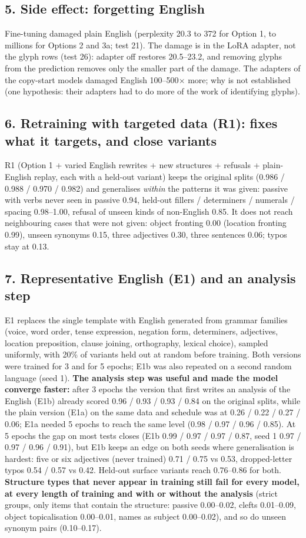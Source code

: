 \documentclass[10pt,a4paper,oneside]{article}
\begin{document}
\subsection*{5. Side effect: forgetting English}
Fine-tuning damaged plain English (perplexity 20.3 to 372 for Option 1, to millions for Options 2 and 3a; test 21).
The damage is in the LoRA adapter, not the glyph rows (test 26): adapter off restores 20.5--23.2, and removing glyphs
from the prediction removes only the smaller part of the damage. The adapters of the copy-start models damaged English
100--500$\times$ more; why is not established (one hypothesis: their adapters had to do more of the work of
identifying glyphs).

\subsection*{6. Retraining with targeted data (R1): fixes what it targets, and close variants}
R1 (Option 1 + varied English rewrites + new structures + refusals + plain-English replay, each with a held-out
variant) keeps the original splits (0.986 / 0.988 / 0.970 / 0.982) and generalises \emph{within} the patterns it was
given: passive with verbs never seen in passive 0.94, held-out fillers / determiners / numerals / spacing 0.98--1.00,
refusal of unseen kinds of non-English 0.85. It does not reach neighbouring cases that were not given: object fronting
0.00 (location fronting 0.99), unseen synonyms 0.15, three adjectives 0.30, three sentences 0.06; typos stay at 0.13.

\subsection*{7. Representative English (E1) and an analysis step}
E1 replaces the single template with English generated from grammar families (voice, word order, tense expression,
negation form, determiners, adjectives, location preposition, clause joining, orthography, lexical choice), sampled
uniformly, with 20\% of variants held out at random before training. Both versions were trained for 3 and for 5 epochs;
E1b was also repeated on a second random language (seed 1).
\textbf{The analysis step was useful and made the model converge faster:} after 3 epochs the version that first writes
an analysis of the English (E1b) already scored 0.96 / 0.93 / 0.93 / 0.84 on the original splits, while the plain
version (E1a) on the same data and schedule was at 0.26 / 0.22 / 0.27 / 0.06; E1a needed 5 epochs to reach the same
level (0.98 / 0.97 / 0.96 / 0.85). At 5 epochs the gap on most tests closes (E1b 0.99 / 0.97 / 0.97 / 0.87, seed 1
0.97 / 0.97 / 0.96 / 0.91), but E1b keeps an edge on both seeds where generalisation is hardest: five or six adjectives
(never trained) 0.71 / 0.75 vs 0.53, dropped-letter typos 0.54 / 0.57 vs 0.42. Held-out surface variants reach
0.76--0.86 for both. \textbf{Structure types that never appear in training still fail for every model, at every
length of training and with or without the analysis} (strict groups, only items that contain the structure: passive
0.00--0.02, clefts 0.01--0.09, object topicalisation 0.00--0.01, names as subject 0.00--0.02), and so do unseen synonym
pairs (0.10--0.17).
\end{document}
